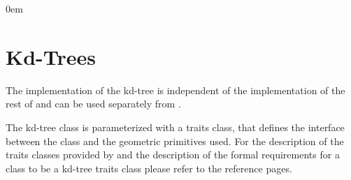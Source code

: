 %



\renewcommand{\Re}{{\rm I\!\hspace{-0.025em} R}}
\newcommand{\new}[1]{\marginpar{\sf #1}}
\newcommand{\kdt}{kd-tree}
\newcommand{\kdts}{kd-trees}
\newcommand{\brc}[1]{\left\{ {#1} \right\}}
\def\Ipe#1{\def\IPEfile{#1}}

\parindent0em
\setlength{\parskip}{1ex minus 0.9ex}
\sloppy

%


\clearpage

\section{Kd-Trees} 
\label{KDT_section}


The implementation of the {\kdt}  is independent of the implementation of
the rest of {\cgal}  and can be used separately from \cgal. 


The kd-tree class is parameterized with a traits class, that defines
the interface between the class and the geometric primitives used.
For the description of the traits classes provided by {\cgal}
and the description of the formal requirements for a class to be 
a kd-tree traits class please refer to the reference pages.


